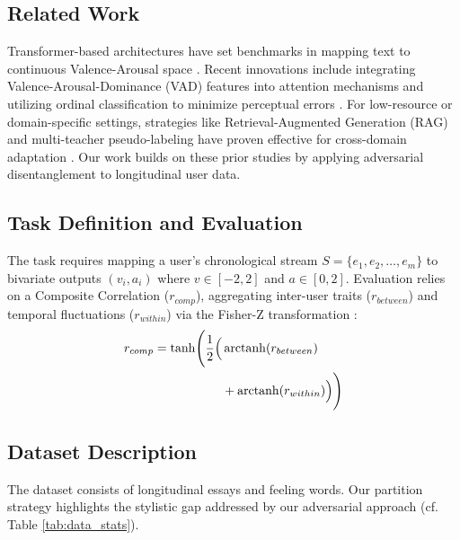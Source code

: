 \documentclass[11pt, a4paper]{article}
\begin{document}
\subsection{Related Work}
Transformer-based architectures have set benchmarks in mapping text to continuous Valence-Arousal space \citep{mendes2023quantifying}. Recent innovations include integrating Valence-Arousal-Dominance (VAD) features into attention mechanisms \citep{moreno2025utbnlp} and utilizing ordinal classification to minimize perceptual errors \citep{mitsios2024improved}. For low-resource or domain-specific settings, strategies like Retrieval-Augmented Generation (RAG) \citep{lewis2020retrieval} and multi-teacher pseudo-labeling have proven effective for cross-domain adaptation \citep{jian-etal-2025-cyut}. Our work builds on these prior studies by applying adversarial disentanglement to longitudinal user data.

\subsection{Task Definition and Evaluation}
The task requires mapping a user's chronological stream $S = \{e_1, e_2, \dots, e_m\}$ to bivariate outputs $(v_i, a_i)$ where $v \in [-2, 2]$ and $a \in [0, 2]$. Evaluation relies on a Composite Correlation \citep{soni-etal-2026-semeval} ($r_{comp}$), aggregating inter-user traits ($r_{between}$) and temporal fluctuations ($r_{within}$) via the Fisher-Z transformation \citep{10.1093/biomet/10.4.507}: 
\begin{equation}
\begin{aligned}
    r_{comp} = \tanh\Biggl( \frac{1}{2} \Bigl( &\operatorname{arctanh}(r_{between}) \\ 
    &+ \operatorname{arctanh}(r_{within}) \Bigr) \Biggr)
\end{aligned}
\end{equation}

\subsection{Dataset Description}
The dataset consists of longitudinal essays and feeling words. Our partition strategy highlights the stylistic gap addressed by our adversarial approach (cf. Table \ref{tab:data_stats}).
\end{document}

